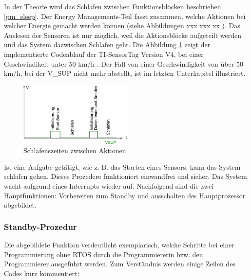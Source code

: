 In der Theorie wird das Schlafen zwischen Funktionsblöcken beschrieben \ref{pm_sleep}. Der Energy Managements-Teil fasst zusammen, welche Aktionen bei welcher Energie gemacht werden können (siehe Abbildungen xxx  xxx xx ). Das Auslesen der Sensoren ist nur möglich, weil die Aktionsblöcke aufgeteilt werden und das System dazwischen Schlafen geht. Die Abbildung \ref{warten_zw_bloecken} zeigt der implementierte Codeablauf der TI-SensorTag Version V4, bei einer Geschwindikeit unter 50 km/h . Der Fall von einer Geschwindigkeit von über 50 km/h, bei der V\_SUP nicht mehr abstellt, ist im letzten Unterkapitel illustriert.

\begin{figure}[ht]
  \includegraphics[width=0.5\textwidth]{3Vorgehen/imag/schlafen_funktionen.png}
  \caption{Schlafenszeiten zwischen Aktionen}
  \label{warten_zw_bloecken}
\end{figure}

Ist eine Aufgabe getätigt, wie z. B. das Starten eines Sensors, kann das System schlafen gehen. Dieses Prozedere funktioniert einwandfrei und sicher. Das System wacht aufgrund eines Interrupts wieder auf. Nachfolgend sind die zwei Hauptfunktionen: Vorbereiten zum Standby und ausschalten des Hauptprozessor abgebildet.

\subsubsection{Standby-Prozedur}
\label{vorbereiten}

Die abgebildete Funktion verdeutlicht exemplarisch, welche Schritte bei einer Programmierung ohne RTOS durch die Programmiererin bzw. den Programmierer ausgeführt werden.  Zum Verständnis werden einige Zeilen des Codes kurz kommentiert:\\ 

